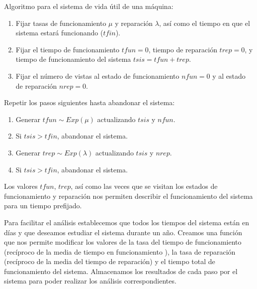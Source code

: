 \documentclass[
]{book}
\providecommand{\tightlist}{%
  \setlength{\itemsep}{0pt}\setlength{\parskip}{0pt}}
\newenvironment{silverbox}{
  \definecolor{shadecolor}{rgb}{192, 192, 192}  
  \color{black}
  \begin{shaded}}
 {\end{shaded}}
\theoremstyle{definition}
\theoremstyle{definition}
\theoremstyle{definition}
\theoremstyle{definition}
\theoremstyle{remark}
\begin{document}
\begin{silverbox}
Algoritmo para el sistema de vida útil de una máquina:

\begin{enumerate}
\def\labelenumi{\arabic{enumi}.}
\tightlist
\item
  Fijar tasas de funcionamiento \(\mu\) y reparación \(\lambda\), así como el tiempo en que el sistema estará funcionando (\(tfin\)).
\item
  Fijar el tiempo de funcionamiento \(tfun = 0\), tiempo de reparación \(trep = 0\), y tiempo de funcionamiento del sistema \(tsis = tfun + trep\).
\item
  Fijar el número de vistas al estado de funcionamiento \(nfun = 0\) y al estado de reparación \(nrep =0\).
\end{enumerate}

Repetir los pasos siguientes hasta abandonar el sistema:

\begin{enumerate}
\def\labelenumi{\arabic{enumi}.}
\setcounter{enumi}{2}
\tightlist
\item
  Generar \(tfun \sim Exp(\mu)\) actualizando \(tsis\) y \(nfun\).
\item
  Si \(tsis > tfin\), abandonar el sistema.
\item
  Generar \(trep \sim Exp(\lambda)\) actualizando \(tsis\) y \(nrep\).
\item
  Si \(tsis > tfin\), abandonar el sistema.
\end{enumerate}

Los valores \(tfun\), \(trep\), así como las veces que se visitan los estados de funcionamiento y reparación nos permiten describir el funcionamiento del sistema para un tiempo prefijado.

\end{silverbox}

Para facilitar el análisis establecemos que todos los tiempos del sistema están en días y que deseamos estudiar el sistema durante un año. Creamos una función que nos permite modificar los valores de la tasa del tiempo de funcionamiento (recíproco de la media de tiempo en funcionamiento ), la tasa de reparación (recíproco de la media del tiempo de reparación) y el tiempo total de funcionamiento del sistema. Almacenamos los resultados de cada paso por el sistema para poder realizar los análisis correspondientes.
\end{document}
